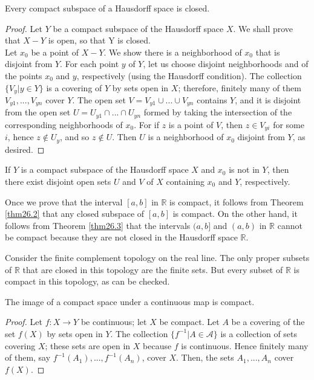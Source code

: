 \documentclass[a4paper,english,12pt]{article}
\begin{document}
\begin{thm}\label{thm26.3}
	Every compact subspace of a Hausdorff space is closed.
\end{thm}
\begin{proof}
	Let $Y$ be a compact subspace of the Hausdorff space $X$. We shall prove that $X - Y$ is open, so that Y is closed.\\
	Let $x_0$ be a point of $X - Y$. We show there is a neighborhood of $x_0$ that is disjoint	from $Y$. For each point $y$ of $Y$, let us choose disjoint neighborhoods and of the
	points $x_0$ and $y$, respectively (using the Hausdorff condition). The collection $\{V_y | y \in Y\}$ is a covering of $Y$ by sets open in $X$; therefore, finitely many of them $V_{y1},...,V_{yn}$ cover $Y$. The open set $V = V_{y1} \cup ... \cup V_{yn}$ contains $Y$, and it is disjoint from the open set $U = U_{y1} \cap ... \cap U_{yn}$ formed by taking the intersection of the corresponding neighborhoods of $x_0$. For if $z$ is a point of $V$, then $z \in V_{yi}$ for some $i$, hence $z \notin U_y$, and so $z \notin U$. Then $U$ is a neighborhood of $x_0$ disjoint from $Y$, as desired. 
\end{proof}

\begin{lem}
	If $Y$ is a compact subspace of the Hausdorff space $X$ and $x_0$ is not in $Y$, then there exist disjoint open sets $U$ and $V$ of $X$ containing $x_0$ and $Y$, respectively.
\end{lem}

\begin{exmp}
	Once we prove that the interval $[a,b]$ in $\mathbb{R}$ is compact, it follows from	Theorem \ref{thm26.2} that any closed subspace of $[a,b]$ is compact. On the other hand, it follows from Theorem \ref{thm26.3} that the intervals $(a, b]$ and $(a, b)$ in $\mathbb{R}$ cannot be compact because they are not closed in the Hausdorff space $\mathbb{R}$.
\end{exmp}

\begin{exmp}
	Consider the finite complement topology on the real line. The only proper subsets of $\mathbb{R}$ that are closed in this topology are the finite sets. But every subset of $\mathbb{R}$ is compact in this topology, as can be checked.
\end{exmp}

\begin{thm}
	The image of a compact space under a continuous map is compact.
\end{thm}
\begin{proof}
	Let $f: X \rightarrow Y$ be continuous; let $X$ be compact. Let $A$ be a covering of the set $f(X)$ by sets open in $Y$. The collection $\{f^{-1} | A \in \mathcal{A}\}$ is a collection of sets covering $X$; these sets are open in $X$ because $f$ is continuous. Hence finitely many of them, say $f^{-1}(A_1),...,f^{-1}(A_n)$, cover $X$. Then, the sets $A_1,...,A_n$ cover $f(X)$.
\end{proof}
\end{document}
